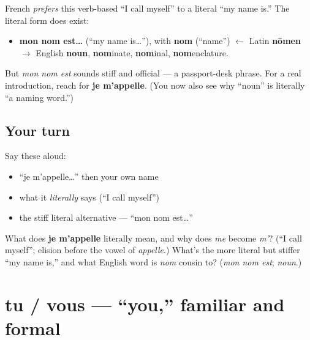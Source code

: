 \begin{culture}
French \emph{prefers} this verb-based \textquotedblleft{}I call myself\textquotedblright{} to a literal \textquotedblleft{}my name is.\textquotedblright{} The literal form does exist:

\begin{itemize}
\raggedright
  \item \textbf{mon nom est…} (\textquotedblleft{}my name is…\textquotedblright{}), with \textbf{nom} (\textquotedblleft{}name\textquotedblright{}) $\leftarrow$ Latin \textbf{nōmen} $\to$ English \textbf{noun}, \textbf{nom}inate, \textbf{nom}inal, \textbf{nom}enclature.
\end{itemize}

But \emph{mon nom est} sounds stiff and official — a passport-desk phrase. For a real introduction, reach for \textbf{je m'appelle}. (You now also see why \textquotedblleft{}noun\textquotedblright{} is literally \textquotedblleft{}a naming word.\textquotedblright{})
\end{culture}

\subsection*{Your turn}
Say these aloud:

\begin{itemize}
\raggedright
  \item \textquotedblleft{}je m'appelle…\textquotedblright{} then your own name
  \item what it \emph{literally} says (\textquotedblleft{}I call myself\textquotedblright{})
  \item the stiff literal alternative — \textquotedblleft{}mon nom est…\textquotedblright{}
\end{itemize}

\begin{tcolorbox}[breakable,colback=teal!4,colframe=teal!35!black,title={Before you move on}]
What does \textbf{je m'appelle} literally mean, and why does \emph{me} become \emph{m'}? (\textquotedblleft{}I call myself\textquotedblright{}; elision before the vowel of \emph{appelle}.) What's the more literal but stiffer \textquotedblleft{}my name is,\textquotedblright{} and what English word is \emph{nom} cousin to? (\emph{mon nom est}; \emph{noun}.)
\end{tcolorbox}
\section[tu / vous]{tu / vous — \textquotedblleft{}you,\textquotedblright{} familiar and formal}

